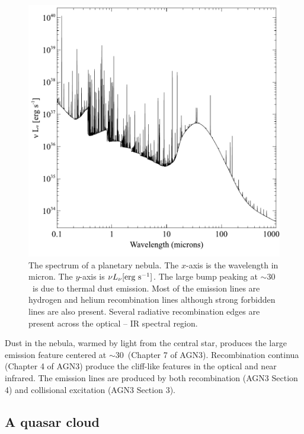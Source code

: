 \documentclass[12pt,twoside]{article}
\begin{document}
{\begin{figure}
\begin{center}
\includegraphics[clip=on,width=0.8\columnwidth,height=0.8\textheight,keepaspectratio]{PN_spectrum}
\end{center}
\caption{The spectrum of a planetary nebula.
The $x$-axis is the wavelength in micron.
The $y$-axis is $\nu L_\nu \rm{[erg\ s^{-1}]}$.
The large bump peaking at $\sim 30$\micron\ is
due to thermal dust emission.
Most of the emission lines are hydrogen and helium recombination lines
although strong forbidden lines are also present.
Several radiative recombination edges are present
across the optical -- IR spectral region.}
\label{fig:PN_spectrum}
\end{figure}

Dust in the nebula, warmed by light from the central star, produces the
large emission feature centered at $\sim 30$\micron\ (Chapter 7 of AGN3).
Recombination continua (Chapter 4 of AGN3) produce the cliff-like features
in the optical and near infrared.  The emission lines are produced by both
recombination (AGN3 Section 4) and collisional excitation (AGN3 Section
3).

\subsection{A quasar cloud}
\label{sec:QuasarCloud}

}
\end{document}
